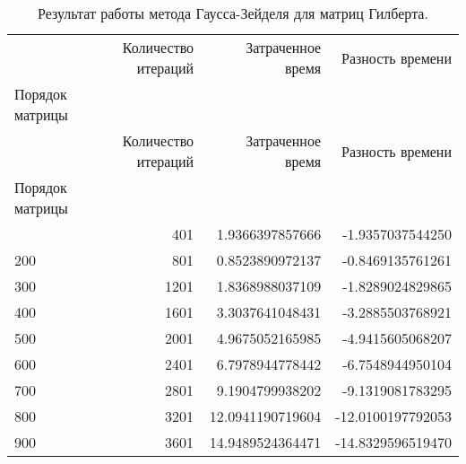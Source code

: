 \begin{longtable}{lrrr}
\label{gil1}\\
\caption{Результат работы метода Гаусса-Зейделя для матриц Гилберта.}\\
\toprule
 & Количество итераций & Затраченное время & Разность времени \\
Порядок матрицы &  &  &  \\
\midrule
\endfirsthead
\toprule
 & Количество итераций & Затраченное время & Разность времени \\
Порядок матрицы &  &  &  \\
\midrule
\endhead
\midrule
\midrule
\endfoot
\bottomrule
\endlastfoot
100 & 401 & 1.9366397857666 & -1.9357037544250 \\
200 & 801 & 0.8523890972137 & -0.8469135761261 \\
300 & 1201 & 1.8368988037109 & -1.8289024829865 \\
400 & 1601 & 3.3037641048431 & -3.2885503768921 \\
500 & 2001 & 4.9675052165985 & -4.9415605068207 \\
600 & 2401 & 6.7978944778442 & -6.7548944950104 \\
700 & 2801 & 9.1904799938202 & -9.1319081783295 \\
800 & 3201 & 12.0941190719604 & -12.0100197792053 \\
900 & 3601 & 14.9489524364471 & -14.8329596519470 \\
\end{longtable}
